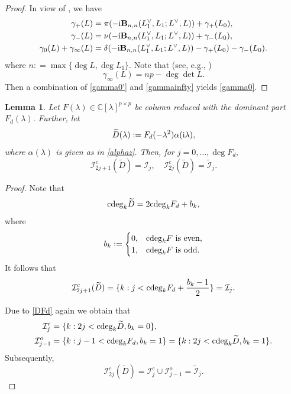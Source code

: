 \documentclass[12pt,reqno]{amsart}
\theoremstyle{plain}
\newtheorem{lemma}[theorem]{Lemma}
\numberwithin{equation}{section}
\theoremstyle{remark}
\def\wtilde{\widetilde} \def\what{\widehat}
\newcommand{\coloneqq}{\mathrel{\mathop:}=}
\begin{document}
\begin{proof}  In view of \cite[Theorem 2.1]{LT82}, we have
\begin{align}
\gamma_+(L)&=\pi(-{\rm i} {\bf B}_{n,n}(L_1^{\vee},L_1;L^{\vee},L)) + \gamma_+(L_0), \nonumber  \\
\gamma_-(L)&=\nu(-{\rm i} {\bf B}_{n,n}(L_1^{\vee},L_1;L^{\vee},L)) + \gamma_-(L_0),  \nonumber  \\
\gamma_{0}(L)+\gamma_{\infty}(L)&=\delta(-{\rm i} {\bf B}_{n,n}(L_1^{\vee},L_1;L^{\vee},L))-\gamma_+(L_0)-\gamma_-(L_0).  \label{gamma0'}
\end{align}
where $n\coloneqq\max\{\deg L, \deg L_1\}$.
Note that (see, e.g., \cite{GHN})
\begin{equation}\label{gammainfty}
\gamma_{\infty}(L)=np-\deg \det L.
\end{equation}
Then a combination of \eqref{gamma0'} and \eqref{gammainfty} yields \eqref{gamma0}.

\end{proof}


\begin{lemma}\label{LemIndexDFd} Let $F(\lambda)\in\mathbb C[\lambda]^{p\times p}$ be column reduced with the dominant part $F_d(\lambda)$. Further, let
\begin{equation}\label{wtildeD}
\wtilde D(\lambda):= F_d(-\lambda^2)\alpha({\rm i}\lambda),
\end{equation}
where $\alpha(\lambda)$ is given as in \eqref{alphaz}.
Then, for $j=0,\ldots,\deg F_d,$
$$
\mathcal I_{2j+1}^c(\wtilde D)=\mathcal I_{j},\quad \mathcal I_{2j}^c(\wtilde D)=\wtilde {\mathcal I}_j.
$$
\end{lemma}

\begin{proof}
Note that 
\begin{equation}\label{DFd}
{\rm cdeg}_k\wtilde D=2{\rm cdeg}_kF_d+b_k,
\end{equation}
where 
$$
b_k:=\begin{cases}
0, & {\rm cdeg}_kF  {\rm\ is\ even},\\
1, & {\rm cdeg}_kF  {\rm\ is\ odd}.
\end{cases}
$$
It follows that
$$
\mathcal I_{2j+1}^c(\wtilde D)=\{k : j<{\rm cdeg}_kF_d+\frac{b_k-1}{2}\}=\mathcal I_{j}.
$$

Due to \eqref{DFd} again we obtain that 
\begin{align*}
\mathcal I^e_{j}&=\{k  : 2j<{\rm cdeg}_k\wtilde D,b_k=0\},\\
 \mathcal I_{j-1}^o&=\{k  : j-1<{\rm cdeg}_kF_d,b_k=1\}
 =\{k : 2j<{\rm cdeg}_k\wtilde D,b_k=1\}.
\end{align*}
Subsequently, 
$$
\mathcal I_{2j}^c(\wtilde D)=\mathcal I_j^e\cup \mathcal I_{j-1}^o=\wtilde {\mathcal I}_j.
$$
\end{proof}
\end{document}
